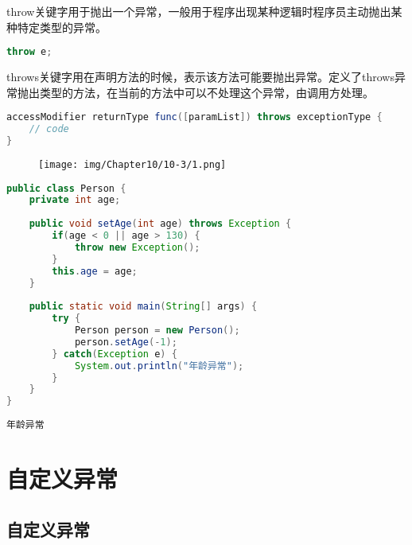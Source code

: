 throw关键字用于抛出一个异常，一般用于程序出现某种逻辑时程序员主动抛出某种特定类型的异常。

\vspace{-0.5cm}

\begin{lstlisting}[language=Java]
throw e;
\end{lstlisting}

throws关键字用在声明方法的时候，表示该方法可能要抛出异常。定义了throws异常抛出类型的方法，在当前的方法中可以不处理这个异常，由调用方处理。

\vspace{-0.5cm}

\begin{lstlisting}[language=Java]
accessModifier returnType func([paramList]) throws exceptionType {
    // code
}
\end{lstlisting}

\begin{figure}[H]
    \centering
    \texttt{[image: img/Chapter10/10-3/1.png]}
\end{figure}


\begin{lstlisting}[language=Java]
public class Person {
    private int age;
    
    public void setAge(int age) throws Exception {
        if(age < 0 || age > 130) {
            throw new Exception();
        }
        this.age = age; 
    }
    
    public static void main(String[] args) {
        try {
            Person person = new Person();
            person.setAge(-1);
        } catch(Exception e) {
            System.out.println("年龄异常");
        }
    }
}
\end{lstlisting}

\begin{tcolorbox}
    \begin{verbatim}
年龄异常
	\end{verbatim}
\end{tcolorbox}

\newpage

\section{自定义异常}

\subsection{自定义异常}

